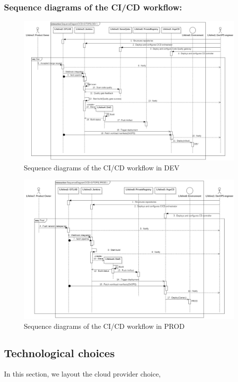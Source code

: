 \subsubsection{Sequence diagrams of the CI/CD workflow: }

\begin{figure}[H]\centering
\includegraphics[width=1.0\textwidth,angle=00]{assets/f5.jpg}
\caption{Sequence diagrams of the CI/CD workflow in DEV}
\label{fig:f5}
\end{figure}

\begin{figure}[H]\centering
\includegraphics[width=1.0\textwidth,angle=00]{assets/f6.jpg}
\caption{Sequence diagrams of the CI/CD workflow in PROD}
\label{fig:f6}
\end{figure}


\subsection{Technological choices }
In this section, we layout the cloud provider choice,
